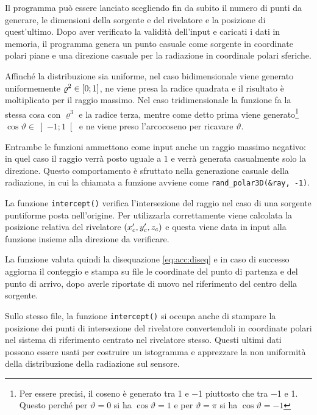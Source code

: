         Il programma può essere lanciato scegliendo fin da subito il numero di punti da generare, le dimensioni della sorgente e del rivelatore e la posizione di quest'ultimo. Dopo aver verificato la validità dell'input e caricati i dati in memoria, il programma genera un punto casuale come sorgente in coordinate polari piane e una direzione casuale per la radiazione in coordinale polari sferiche.
        
        Affinché la distribuzione sia uniforme, nel caso bidimensionale viene generato uniformemente $\varrho^2 \in \bqty{0;1}$, ne viene presa la radice quadrata e il risultato è moltiplicato per il raggio massimo. Nel caso tridimensionale la funzione fa la stessa cosa con $\varrho^3$ e la radice terza, mentre come detto prima viene generato\footnote{Per essere precisi, il coseno è generato tra \num{1} e \num{-1} piuttosto che tra \num{-1} e \num{1}. Questo perché per $\vartheta = 0$ si ha $\cos\!\vartheta = \num{1}$ e per $\vartheta = \pi$ si ha $\cos\!\vartheta = \num{-1}$} $\cos\!\vartheta \in \left]-1;1\right[$ e ne viene preso l'arcocoseno per ricavare $\vartheta$.

        Entrambe le funzioni ammettono come input anche un raggio massimo negativo: in quel caso il raggio verrà posto uguale a $1$ e verrà generata casualmente solo la direzione. Questo comportamento è sfruttato nella generazione casuale della radiazione, in cui la chiamata a funzione avviene come \verb|rand_polar3D(&ray, -1)|.
        
        La funzione \verb|intercept()| verifica l'intersezione del raggio nel caso di una sorgente puntiforme posta nell'origine. Per utilizzarla correttamente viene calcolata la posizione relativa del rivelatore $\pqty{x_c', y_c', z_c}$ e questa viene data in input alla funzione insieme alla direzione da verificare.
        
        La funzione valuta quindi la disequazione \eqref{eq:acc:diseq} e in caso di successo aggiorna il conteggio e stampa su file le coordinate del punto di partenza e del punto di arrivo, dopo averle riportate di nuovo nel riferimento del centro della sorgente.

        Sullo stesso file, la funzione \verb|intercept()| si occupa anche di stampare la posizione dei punti di intersezione del rivelatore convertendoli in coordinate polari nel sistema di riferimento centrato nel rivelatore stesso. Questi ultimi dati possono essere usati per costruire un istogramma e apprezzare la non uniformità della distribuzione della radiazione sul sensore.

